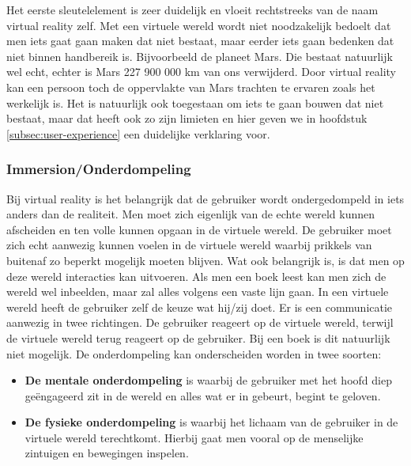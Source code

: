 Het eerste sleutelelement is zeer duidelijk en vloeit rechtstreeks van de naam virtual reality zelf. Met een virtuele wereld wordt niet noodzakelijk bedoelt dat men iets gaat gaan maken dat niet bestaat, maar eerder iets gaan bedenken dat niet binnen handbereik is. Bijvoorbeeld de planeet Mars. Die bestaat natuurlijk wel echt, echter is Mars 227 900 000 km van ons verwijderd. Door virtual reality kan een persoon toch de oppervlakte van Mars trachten te ervaren zoals het werkelijk is. Het is natuurlijk ook toegestaan om iets te gaan bouwen dat niet bestaat, maar dat heeft ook zo zijn limieten en hier geven we in hoofdstuk \ref{subsec:user-experience} een duidelijke verklaring voor.

\subsubsection{Immersion/Onderdompeling}
\label{ssubsec:immersion}
Bij virtual reality is het belangrijk dat de gebruiker wordt ondergedompeld in iets anders dan de realiteit. Men moet zich eigenlijk van de echte wereld kunnen afscheiden en ten volle kunnen opgaan in de virtuele wereld. De gebruiker moet zich echt aanwezig kunnen voelen in de virtuele wereld waarbij prikkels van buitenaf zo beperkt mogelijk moeten blijven. Wat ook belangrijk is, is dat men op deze wereld interacties kan uitvoeren. Als men een boek leest kan men zich de wereld wel inbeelden, maar zal alles volgens een vaste lijn gaan. In een virtuele wereld heeft de gebruiker zelf de keuze wat hij/zij doet. Er is een communicatie aanwezig in twee richtingen. De gebruiker reageert op de virtuele wereld, terwijl de virtuele wereld terug reageert op de gebruiker. Bij een boek is dit natuurlijk niet mogelijk. De onderdompeling kan onderscheiden worden in twee soorten:

\begin{itemize}
	\item \textbf{De mentale onderdompeling} is waarbij de gebruiker met het hoofd diep geëngageerd zit in de wereld en alles wat er in gebeurt, begint te geloven.
	\item \textbf{De fysieke onderdompeling} is waarbij het lichaam van de gebruiker  in de virtuele wereld terechtkomt. Hierbij gaat men vooral op de menselijke zintuigen en bewegingen inspelen.
\end{itemize}

